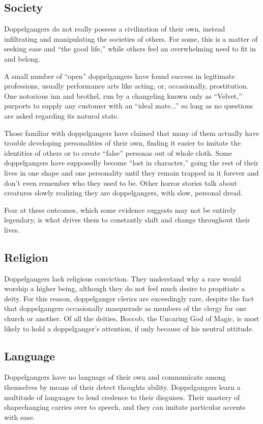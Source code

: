 \subsection{Society}
{Doppelgangers do not really possess a civilization of their own, instead infiltrating and manipulating the societies of others. For some, this is a matter of seeking ease and “the good life,” while others feel an overwhelming need to fit in and belong.

A small number of “open” doppelgangers have found success in legitimate professions, usually performance arts like acting, or, occasionally, prostitution. One notorious inn and brothel, run by a changeling known only as “Velvet,” purports to supply any customer with an “ideal mate...” so long as no questions are asked regarding its natural state.

Those familiar with doppelgangers have claimed that many of them actually have trouble developing personalities of their own, finding it easier to imitate the identities of others or to create “false” personas out of whole cloth. Some doppelgangers have supposedly become “lost in character,” going the rest of their lives in one shape and one personality until they remain trapped in it forever and don’t even remember who they used to be. Other horror stories talk about creatures slowly realizing they are doppelgangers, with slow, personal dread.

Fear at these outcomes, which some evidence suggests may not be entirely legendary, is what drives them to constantly shift and change throughout their lives.}

\subsection{Religion}
{Doppelgangers lack religious conviction. They understand why a race would worship a higher being, although they do not feel much desire to propitiate a deity. For this reason, doppelganger clerics are exceedingly rare, despite the fact that doppelgangers occasionally masquerade as members of the clergy for one church or another. Of all the deities, Boccob, the Uncaring God of Magic, is most likely to hold a doppelganger’s attention, if only because of his neutral attitude.}

\subsection{Language}
{Doppelgangers have no language of their own and communicate among themselves by means of their detect thoughts ability. Doppelgangers learn a multitude of languages to lend credence to their disguises. Their mastery of shapechanging carries over to speech, and they can imitate particular accents with ease.}

